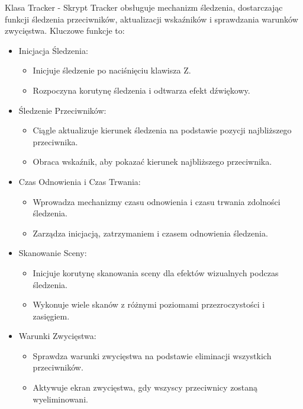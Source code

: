 Klasa Tracker -
Skrypt Tracker obsługuje mechanizm śledzenia, dostarczając funkcji śledzenia przeciwników, aktualizacji wskaźników i sprawdzania warunków zwycięstwa. Kluczowe funkcje to:
\begin{itemize}
\item Inicjacja Śledzenia:
\begin{itemize}
\item Inicjuje śledzenie po naciśnięciu klawisza Z.
\item Rozpoczyna korutynę śledzenia i odtwarza efekt dźwiękowy.
\end{itemize}
\item Śledzenie Przeciwników:
\begin{itemize}
\item Ciągle aktualizuje kierunek śledzenia na podstawie pozycji najbliższego przeciwnika.
\item Obraca wskaźnik, aby pokazać kierunek najbliższego przeciwnika.
\end{itemize}
\item Czas Odnowienia i Czas Trwania:
\begin{itemize}
\item Wprowadza mechanizmy czasu odnowienia i czasu trwania zdolności śledzenia.
\item Zarządza inicjacją, zatrzymaniem i czasem odnowienia śledzenia.
\end{itemize}
\item Skanowanie Sceny:
\begin{itemize}
\item Inicjuje korutynę skanowania sceny dla efektów wizualnych podczas śledzenia.
\item Wykonuje wiele skanów z różnymi poziomami przezroczystości i zasięgiem.
\end{itemize}
\item Warunki Zwycięstwa:
\begin{itemize}
\item Sprawdza warunki zwycięstwa na podstawie eliminacji wszystkich przeciwników.
\item Aktywuje ekran zwycięstwa, gdy wszyscy przeciwnicy zostaną wyeliminowani.
\end{itemize}
\end{itemize}


